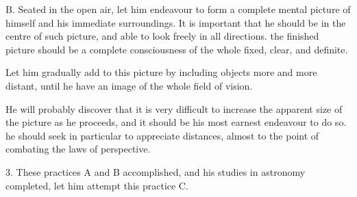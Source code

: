 \begin{quoting}

B. Seated in the open air, let him endeavour to form a complete mental picture of himself and his immediate surroundings. It is important that he should be in the centre of such picture, and able to look freely in all directions. the finished picture should be a complete consciousness of the whole fixed, clear, and definite.

Let him gradually add to this picture by including objects more and more distant, until he have an image of the whole field of vision.

He will probably discover that it is very difficult to increase the apparent size of the picture as he proceeds, and it should be his most earnest endeavour to do so. he should seek in particular to appreciate distances, almost to the point of combating the laws of perspective.

\end{quoting}


3. These practices A and B accomplished, and his studies in astronomy completed, let him attempt this practice C.


